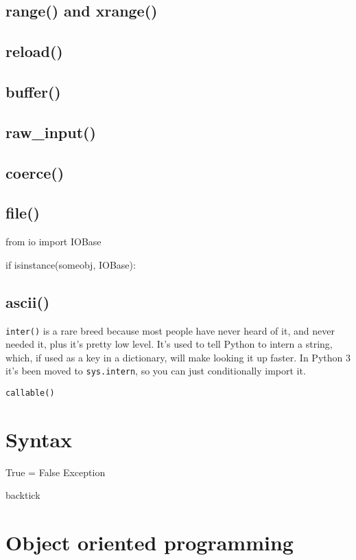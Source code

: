 \subsection{range() and xrange()}

\subsection{reload()}

\subsection{buffer()}

\subsection{raw\_input()}

\subsection{coerce()}

\subsection{file()}

\begin{py}
from io import IOBase

if isinstance(someobj, IOBase):
\end{py}

\subsection{ascii()}

\lstinline{inter()} is a rare breed because most people have never heard of it, and never needed it, plus it's pretty low level. It's used to tell Python to intern a string, which, if used as a key in a dictionary, will make looking it up faster. In Python 3 it's been moved to \lstinline{sys.intern}, so you can just conditionally import it.

\lstinline{callable()}

\section{Syntax}

True = False
Exception

backtick


\section{Object oriented programming}


